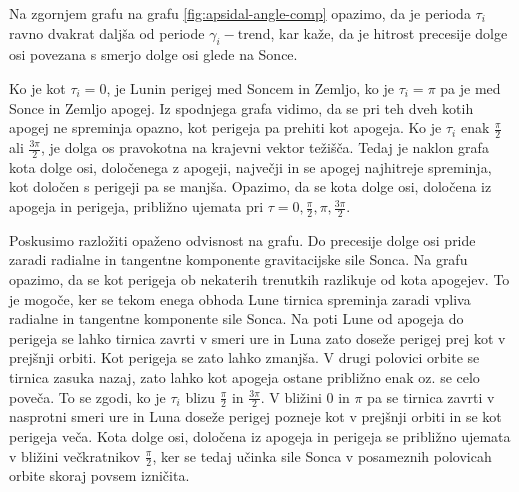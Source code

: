 \documentclass[a4paper,12pt]{article}
\begin{document}
\noindent
Na zgornjem grafu na grafu \ref{fig:apsidal-angle-comp} opazimo, da je perioda
$\tau_i$ ravno dvakrat daljša od periode $\gamma_i-\mathrm{trend}$, kar kaže, 
da je hitrost precesije dolge osi povezana s smerjo dolge osi glede na Sonce.

Ko je kot $\tau_i=0$, je Lunin perigej med Soncem in Zemljo, ko je $\tau_i=\pi$ 
pa je med Sonce in Zemljo apogej. Iz spodnjega grafa vidimo, da se pri teh dveh 
kotih apogej ne spreminja opazno, kot perigeja pa prehiti kot apogeja.  Ko je 
$\tau_i$ enak $\frac{\pi}{2}$ ali $\frac{3\pi}{2}$, je dolga os 
pravokotna na krajevni vektor težišča. Tedaj je naklon grafa kota dolge osi, 
določenega z apogeji, največji in se apogej najhitreje spreminja, kot določen
s perigeji pa se manjša. Opazimo, da se kota dolge osi, določena iz apogeja in 
perigeja, približno ujemata pri $\tau=0,\frac{\pi}{2},\pi,\frac{3\pi}{2}$.

Poskusimo razložiti opaženo odvisnost na grafu. Do precesije dolge osi pride 
zaradi radialne in tangentne komponente gravitacijske sile Sonca. 
Na grafu opazimo, da se kot perigeja ob nekaterih trenutkih razlikuje od
kota apogejev. To je mogoče, ker se tekom enega obhoda Lune tirnica spreminja
zaradi vpliva radialne in tangentne komponente sile Sonca.
Na poti Lune od apogeja do perigeja se lahko tirnica zavrti v smeri ure in Luna 
zato doseže perigej prej kot v prejšnji orbiti. Kot perigeja se zato lahko 
zmanjša. V drugi polovici orbite se tirnica zasuka nazaj, zato lahko kot 
apogeja ostane približno enak oz. se celo poveča. To se zgodi, ko je \linebreak
$\tau_i$ blizu $\frac{\pi}{2}$ in $\frac{3\pi}{2}$. V bližini $0$ in $\pi$ pa
se tirnica zavrti v nasprotni smeri ure in Luna doseže perigej pozneje kot v
prejšnji orbiti in se kot perigeja veča. Kota dolge osi, določena iz 
apogeja in perigeja se približno ujemata v bližini večkratnikov 
$\frac{\pi}{2}$, ker se tedaj učinka sile Sonca v posameznih polovicah orbite 
skoraj povsem izničita. 
\end{document}
